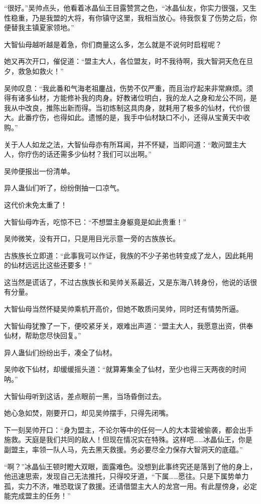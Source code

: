\begin{this_body}
“很好。”吴帅点头，他看着冰晶仙王目露赞赏之色，“冰晶仙友，你实力很强，又生性稳重，乃是我盟的大将，有你镇守这里，我相当放心。待我恢复了伤势之后，你便替我主镇夏家领地。”

大智仙母越听越是着急，你们商量这么多，怎么就是不说何时启程呢？

她又再次开口，催促道：“盟主大人，各位盟友，时不我待啊，我大智洞天危在旦夕，救急如救火！”

吴帅叹息：“我此番和气海老祖鏖战，伤势不仅严重，而且治疗起来非常麻烦。须得有诸多仙材，方能修补我的肉身。好教诸位明白，我的龙人之身和龙公不同，是我从中改良，推陈出新而得。当初炼制这具肉身，就耗用了极多的仙材，代价很大。此番疗伤，也得如此。遗憾的是，我手中仙材缺口不小，还得从宝黄天中收购。”

关于人人如龙之法，大智仙母亦有所耳闻，并不怀疑，当即问道：“敢问盟主大人，你疗伤的话还需多少仙材？我们可以出啊。”

吴帅便报出一份清单。

异人蛊仙们听了，纷纷倒抽一口凉气。

这代价未免太重了！

大智仙母咋舌，吃惊不已：“不想盟主身躯竟是如此贵重！”

吴帅微笑，没有开口，只是用目光示意一旁的古族族长。

古族族长立即道：“此事我可以作证，我族的不少子弟也转变成了龙人，因此耗用的仙材远远比这些还要多！”

这当然是谎话了，不过古族族长和吴帅关系最近，又是东海八转身份，他说的话很有分量。

大智仙母当然怀疑吴帅乘机开高价，但她不敢质问吴帅，同时还有情势所逼。

大智仙母犹豫了一下，便咬紧牙关，艰难出声道：“盟主大人，我愿意出资，供奉仙材，帮助您尽快回复。”

异人蛊仙们纷纷出手，凑全了仙材。

吴帅收下仙材，却缓缓摇头道：“就算筹集全了仙材，至少也得三天两夜的时间呐。”

大智仙母听到这话，差点眼前一黑，当场昏倒过去。

她心急如焚，刚要开口，却见吴帅摆手，只得先闭嘴。

下一刻吴帅开口：“身为盟主，不论尔等中的任何一人的大本营被偷袭，都会出手施救。天庭是我们共同的敌人！但现在情况实在特殊。这样吧……冰晶仙王，你是副盟主，率领一队人马，先去黑天救援。务必要尽全力保存大智洞天的底蕴。”

“啊？”冰晶仙王顿时瞪大双眼，面露难色。没想到此事终究还是落到了他的身上，他迅速思索，发现自己无法推托，只得咬牙道，“下属……愿往。只是下属势单力孤，实力不济，唯恐耽误了救援。还请借盟主大人的龙宫一用。有此屋傍身，必定能完成盟主的任务！”


\end{this_body}
